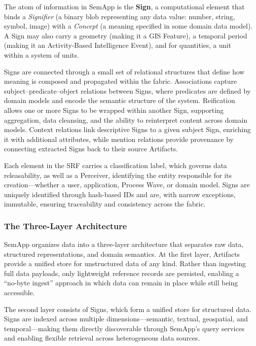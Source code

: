 \documentclass[11pt,a4paper]{article}
\theoremstyle{definition}
\begin{document}
The atom of information in SemApp is the \textbf{Sign}, a computational element that binds a \emph{Signifier} (a binary blob representing any data value: number, string, symbol, image) with a \emph{Concept} (a meaning specified in some domain data model). A Sign may also carry a geometry (making it a GIS Feature), a temporal period (making it an Activity-Based Intelligence Event), and for quantities, a unit within a system of units.

Signs are connected through a small set of relational structures that define how meaning is composed and propagated within the fabric. Associations capture subject--predicate--object relations between Signs, where predicates are defined by domain models and encode the semantic structure of the system. Reification allows one or more Signs to be wrapped within another Sign, supporting aggregation, data cleansing, and the ability to reinterpret content across domain models. Context relations link descriptive Signs to a given subject Sign, enriching it with additional attributes, while mention relations provide provenance by connecting extracted Signs back to their source Artifacts.

Each element in the SRF carries a classification label, which governs data releasability, as well as a Perceiver, identifying the entity responsible for its creation—whether a user, application, Process Wave, or domain model. Signs are uniquely identified through hash-based IDs and are, with narrow exceptions, immutable, ensuring traceability and consistency across the fabric.

\subsubsection{The Three-Layer Architecture}

SemApp organizes data into a three-layer architecture that separates raw data, structured representations, and domain semantics. At the first layer, Artifacts provide a unified store for unstructured data of any kind. Rather than ingesting full data payloads, only lightweight reference records are persisted, enabling a ``no-byte ingest'' approach in which data can remain in place while still being accessible.

The second layer consists of Signs, which form a unified store for structured data. Signs are indexed across multiple dimensions—semantic, textual, geospatial, and temporal—making them directly discoverable through SemApp’s query services and enabling flexible retrieval across heterogeneous data sources.
\end{document}
